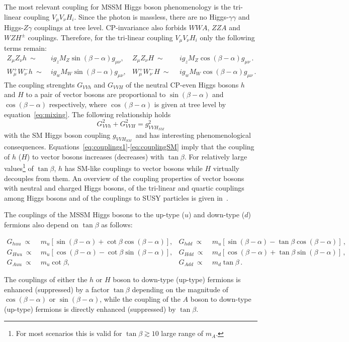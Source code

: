 The most relevant coupling for MSSM Higgs boson phenomenology is  the tri-linear coupling $V_{\mu}V_{\nu}H_i$.
Since the photon is massless, there are no Higgs-$\gamma\gamma$ and Higgs-$Z\gamma$ couplings at tree level. CP-invariance also forbids $WWA$, $ZZA$
and $WZH^{\pm}$ couplings. Therefore, for the tri-linear coupling $V_{\mu}V_{\nu}H_i$  only the following terms remain:
\begin{align} 
Z_{\mu}Z_{\nu} h ~ \sim  ~ & ig_z M_Z \sin(\beta -\alpha) g_{\mu\nu},  &  Z_{\mu}Z_{\nu} H ~ \sim ~  ~    & ig_z M_Z \cos(\beta -\alpha) g_{\mu\nu} \label{eq:couplings1}\,. \\ 
W_{\mu}^+W_{\nu}^- h ~\sim ~&  ig_w M_W \sin(\beta -\alpha) g_{\mu\nu},  &  W_{\mu}^+W_{\nu}^- H ~ \sim ~ ~ & ig_w M_W \cos(\beta -\alpha) g_{\mu\nu} \label{eq:couplings2} \,.
\end{align}
The coupling strenghts $G_{VVh}$ and $G_{VVH}$ of the neutral CP-even Higgs bosons $h$ and $H$ to a pair of 
vector bosons are proportional to $\sin(\beta -\alpha)$ and $\cos(\beta -\alpha)$
respectively, where $\cos(\beta -\alpha)$ is given at tree level by equation~\eqref{eq:mixing}. 
The following relationship holds
\begin{equation}\label{eq:couplingSM}
G^2_{VVh} +G^2_{VVH} = g^2_{VVH_{SM} } 
\end{equation}
with the SM Higgs boson coupling  $g_{VVH_{SM}}\,$  and has interesting phenomenological consequences. 
Equations~\eqref{eq:couplings1}-\eqref{eq:couplingSM} imply that the coupling of $h$ ($H$) to  vector bosons 
increases (decreases) with $\tan\beta$. For relatively large values\footnote{For most scenarios this is valid for  $\tan\beta \apprge 10$ 
large range of $m_A$.} 
of $\tan\beta$, $h$ has SM-like couplings to vector bosons while  $H$ virtually decouples from them. An overview of the 
coupling properties of vector bosons with neutral and charged Higgs bosons, of the tri-linear and quartic couplings among Higgs bosons 
and of the couplings to SUSY particles is given in~\cite{Djuadi}.

The couplings of the MSSM Higgs bosons to the up-type ($u$) and down-type ($d$) fermions also depend on $\tan\beta$
as follows:
\begin{small}
\begin{align*}
G_{huu} ~\propto ~ & m_u [\sin(\beta - \alpha)  + \cot\beta \cos(\beta - \alpha)], & G_{hdd} ~\propto ~ & m_u [\sin(\beta - \alpha)  - \tan\beta \cos(\beta - \alpha)]\,,\\
G_{Huu} ~\propto ~& m_u [\cos(\beta - \alpha)  - \cot\beta \sin(\beta - \alpha)], & G_{Hdd} ~\propto~  & m_d [\cos(\beta - \alpha)  + \tan\beta \sin(\beta - \alpha)]\,,\\
G_{Auu} ~ \propto ~ & m_u  \cot\beta, & G_{Add} ~ \propto ~ & m_d \tan\beta \,.
\end{align*} 
\end{small}
The couplings of either the $h$ or $H$ boson to down-type (up-type) fermions is enhanced (suppressed) by a factor  $\tan\beta$ depending
on the magnitude of $\cos(\beta - \alpha)$ or $\sin(\beta - \alpha)$, while the coupling of the $A$ boson to down-type (up-type) fermions is directly 
enhanced (suppressed) by $\tan\beta$.


